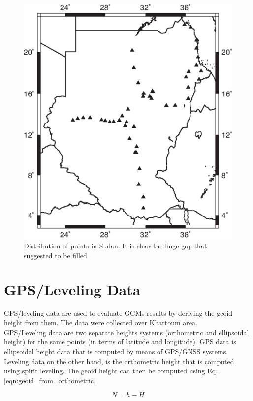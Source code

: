 \begin{figure}[t]
	\caption{Distribution of \citep{osman} points in Sudan. It is clear the huge gap that \citet{osman} suggested to be filled}
	\label{sudan_data_distribution}
	\includegraphics{Figures/points_dist.eps}
	\centering
\end{figure}


\section{GPS/Leveling Data}

GPS/leveling data are used to evaluate GGMs results by deriving the geoid height from them. The data were collected over Khartoum area. \\
GPS/Leveling data are two separate heights systems (orthometric and ellipsoidal height) for the same points (in terms of latitude and longitude). GPS data is ellipsoidal height data that is computed by means of GPS/GNSS systems. Leveling data on the other hand, is the orthometric height that is computed using spirit leveling. The geoid height can then be computed using Eq. \eqref{eqn:geoid_from_orthometric}

\begin{equation}
\label{eqn:geoid_from_orthometric}
N = h - H
\end{equation}

